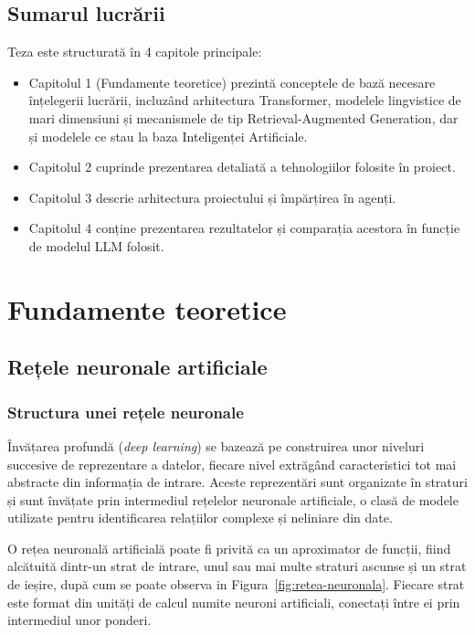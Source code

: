 \documentclass[12pt, a4paper, oneside, romanian]{teza-upb}
\begin{document}
\section{Sumarul lucrării}

Teza este structurată în 4 capitole principale:
\begin{itemize}
    \item Capitolul 1 (Fundamente teoretice) prezintă conceptele de bază necesare înțelegerii lucrării, incluzând arhitectura Transformer, modelele lingvistice de mari dimensiuni și mecanismele de tip Retrieval-Augmented Generation, dar și modelele ce stau la baza Inteligenței Artificiale.
    \item Capitolul 2 cuprinde prezentarea detaliată a tehnologiilor folosite în proiect.
    \item Capitolul 3 descrie arhitectura proiectului și împărțirea în agenți.
    \item Capitolul 4 conține prezentarea rezultatelor și comparația acestora în funcție de modelul LLM folosit.
\end{itemize}


\cleardoublepage
\chapter{Fundamente teoretice}

\section{Rețele neuronale artificiale}
    \subsection{Structura unei rețele neuronale}

Învățarea profundă (\textit{deep learning}) se bazează pe construirea unor niveluri succesive de reprezentare a datelor, fiecare nivel extrăgând caracteristici tot mai abstracte din informația de intrare. Aceste reprezentări sunt organizate în straturi și sunt învățate prin intermediul rețelelor neuronale artificiale, o clasă de modele utilizate pentru identificarea relațiilor complexe și neliniare din date.

O rețea neuronală artificială poate fi privită ca un aproximator de funcții, fiind alcătuită dintr-un strat de intrare, unul sau mai multe straturi ascunse și un strat de ieșire, după cum se poate observa in Figura~\ref{fig:retea-neuronala}. Fiecare strat este format din unități de calcul numite neuroni artificiali, conectați între ei prin intermediul unor ponderi.
\end{document}
